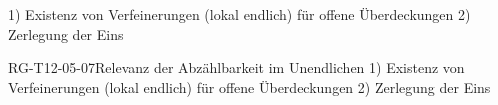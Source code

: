 1) Existenz von Verfeinerungen (lokal endlich) für offene Überdeckungen
2) Zerlegung der Eins

\begin{REM}{RG-T12-05-07}{Relevanz der Abzählbarkeit im Unendlichen
1) Existenz von Verfeinerungen (lokal endlich) für offene Überdeckungen
2) Zerlegung der Eins}
\end{REM}
